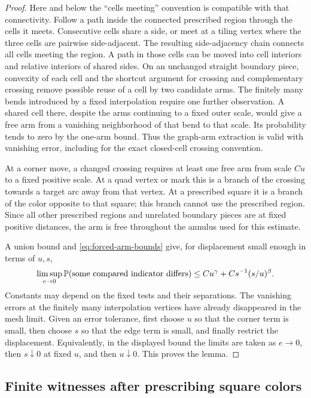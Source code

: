 \begin{proof}
Here and below the ``cells meeting'' convention is compatible with that
connectivity. Follow a path inside the connected prescribed region through
the cells it meets. Consecutive cells share a side, or meet at a tiling vertex
where the three cells are pairwise side-adjacent. The resulting side-adjacency
chain connects all cells meeting the region. A path in those cells can be
moved into cell interiors and relative interiors of shared sides. On an
unchanged straight boundary piece, convexity of each cell and the shortcut
argument for crossing and complementary crossing remove possible reuse of a
cell by two candidate arms. The finitely many bends introduced by a fixed
interpolation require one further observation. A shared cell there, despite
the arms continuing to a fixed outer scale, would give a free arm from a
vanishing neighborhood of that bend to that scale. Its probability tends to
zero by the one-arm bound. Thus the graph-arm extraction is valid with
vanishing error, including for the exact closed-cell crossing convention.

At a corner move, a changed crossing requires at least one free arm from
scale $Cu$ to a fixed positive scale. At a quad vertex or mark this is a
branch of the crossing towards a target arc away from that vertex. At a
prescribed square it is a branch of the color opposite to that square;
this branch cannot use the prescribed region. Since all other prescribed
regions and unrelated boundary pieces are at fixed positive distances,
the arm is free throughout the annulus used for this estimate.

A union bound and \eqref{eq:forced-arm-bounds} give, for displacement small
enough in terms of $u,s$,
\begin{equation}\label{eq:forced-continuity-error}
 \limsup_{e\to0}\mathbb P(\hbox{some compared indicator differs})
 \le C u^\gamma+C s^{-1}(s/u)^\beta.
\end{equation}
Constants may depend on the fixed tests and their separations. The vanishing
errors at the finitely many interpolation vertices have already disappeared
in the mesh limit. Given an error tolerance, first choose $u$ so that the
corner term is small, then choose $s$ so that the edge term is small, and
finally restrict the displacement. Equivalently, in the displayed bound the
limits are taken as $e\to0$, then $s\downarrow0$ at fixed $u$, and then
$u\downarrow0$. This proves the lemma.
\end{proof}

\subsection{Finite witnesses after prescribing square colors}
\label{subsec:forced-witnesses}

